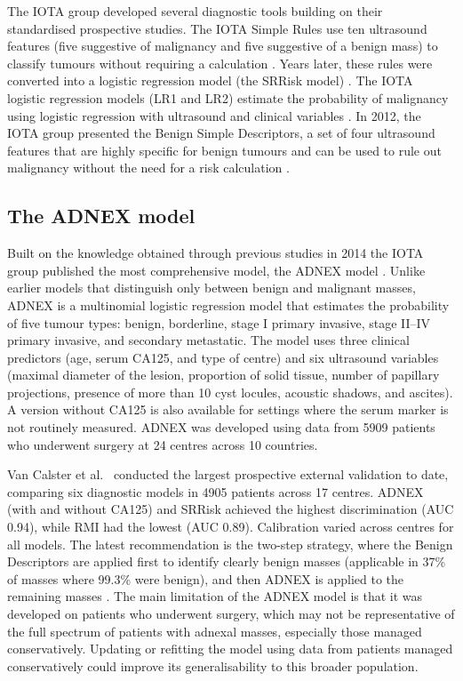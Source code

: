 The \gls{IOTA} group developed several diagnostic tools building on their standardised prospective studies. The \gls{IOTA} Simple Rules use ten ultrasound features (five suggestive of malignancy and five suggestive of a benign mass) to classify tumours without requiring a calculation \cite{timmermanSimpleUltrasoundbasedRules2008}. Years later, these rules were converted into a logistic regression model (the SRRisk model) \cite{timmermanPredictingRiskMalignancy2016}. The \gls{IOTA} logistic regression models (\gls{LR1} and \gls{LR2}) estimate the probability of malignancy using logistic regression with ultrasound and clinical variables \cite{timmermanLogisticRegressionModel2005}. In 2012, the IOTA group presented the Benign Simple Descriptors, a set of four ultrasound features that are highly specific for benign tumours and can be used to rule out malignancy without the need for a risk calculation \cite{ameyeClinicallyOrientedThreeStep2012}. 

\subsection{The ADNEX model}

Built on the knowledge obtained through previous studies in 2014 the IOTA group published the most comprehensive model, the \gls{ADNEX} model \cite{vancalsterEvaluatingRiskOvarian2014}. Unlike earlier models that distinguish only between benign and malignant masses, \gls{ADNEX} is a multinomial logistic regression model that estimates the probability of five tumour types: benign, borderline, stage I primary invasive, stage II--IV primary invasive, and secondary metastatic. The model uses three clinical predictors (age, serum \gls{CA125}, and type of centre) and six ultrasound variables (maximal diameter of the lesion, proportion of solid tissue, number of papillary projections, presence of more than 10 cyst locules, acoustic shadows, and ascites). A version without \gls{CA125} is also available for settings where the serum marker is not routinely measured. \gls{ADNEX} was developed using data from 5909 patients who underwent surgery at 24 centres across 10 countries. 

Van Calster et al.\ \cite{vancalsterValidationModelsDiagnose2020} conducted the largest prospective external validation to date, comparing six diagnostic models in 4905 patients across 17 centres. \gls{ADNEX} (with and without \gls{CA125}) and \gls{SRRisk} achieved the highest discrimination (\gls{AUC} 0.94), while \gls{RMI} had the lowest (\gls{AUC} 0.89). Calibration varied across centres for all models. The latest recommendation is the two-step strategy, where the Benign Descriptors are applied first to identify clearly benign masses (applicable in 37\% of masses where 99.3\% were benign), and then \gls{ADNEX} is applied to the remaining masses \cite{landolfoBenignDescriptorsADNEX2023}. The main limitation of the ADNEX model is that it was developed on patients who underwent surgery, which may not be representative of the full spectrum of patients with adnexal masses, especially those managed conservatively. Updating or refitting the model using data from patients managed conservatively could improve its generalisability to this broader population.

